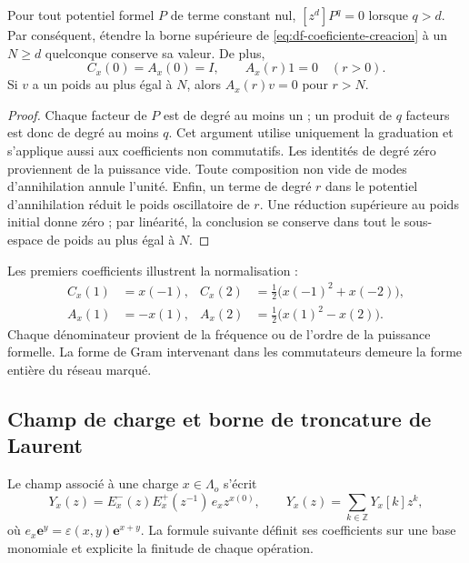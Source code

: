 \begin{lemma}
\label{lem:df-estabilizacion} Pour tout potentiel formel \(P\) de terme constant nul, \([z^d]P^q=0\) lorsque \(q>d\). Par conséquent, étendre la borne supérieure de \eqref{eq:df-coeficiente-creacion} à un \(N\geq d\) quelconque conserve sa valeur. De plus,
\[
 C_x(0)=A_x(0)=I,
 \qquad A_x(r)1=0\quad(r>0).
\]
Si \(v\) a un poids au plus égal à \(N\), alors \(A_x(r)v=0\) pour \(r>N\).
\end{lemma}

\begin{proof}
Chaque facteur de \(P\) est de degré au moins un ; un produit de \(q\) facteurs est donc de degré au moins \(q\). Cet argument utilise uniquement la graduation et s’applique aussi aux coefficients non commutatifs. Les identités de degré zéro proviennent de la puissance vide. Toute composition non vide de modes d’annihilation annule l’unité. Enfin, un terme de degré \(r\) dans le potentiel d’annihilation réduit le poids oscillatoire de \(r\). Une réduction supérieure au poids initial donne zéro ; par linéarité, la conclusion se conserve dans tout le sous-espace de poids au plus égal à \(N\).
\end{proof}

Les premiers coefficients illustrent la normalisation :
\begin{align*}
 C_x(1)&=x(-1),&
 C_x(2)&=\tfrac12\bigl(x(-1)^2+x(-2)\bigr),\\
 A_x(1)&=-x(1),&
 A_x(2)&=\tfrac12\bigl(x(1)^2-x(2)\bigr).
\end{align*}
Chaque dénominateur provient de la fréquence ou de l’ordre de la puissance formelle. La forme de Gram intervenant dans les commutateurs demeure la forme entière du réseau marqué.

\subsection{Champ de charge et borne de troncature de Laurent}
\label{subsec:df-campo-carga}


Le champ associé à une charge \(x\in\Lambda_o\) s’écrit
\begin{equation}
 Y_x(z)=E^-_x(z)E^+_x(z^{-1})\,e_x z^{x(0)},
 \qquad Y_x(z)=\sum_{k\in\mathbb Z}Y_x[k]z^k,
 \label{eq:df-campo}
\end{equation}
où \(e_x\mathbf e^y=\varepsilon(x,y)\mathbf e^{x+y}\). La formule suivante définit ses coefficients sur une base monomiale et explicite la finitude de chaque opération.

